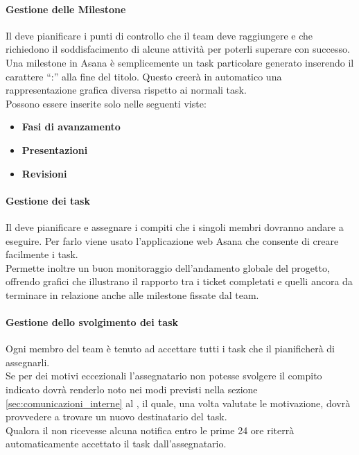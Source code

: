 			\paragraph{Gestione delle Milestone} %
			\label{par:gestione_delle_milestone}
			Il \roleProjectManager{} deve pianificare i punti di controllo che il team deve raggiungere e che richiedono il soddisfacimento di alcune attività per poterli superare con successo. \\
			Una milestone\gloss{} in Asana\gloss{} è semplicemente un task\gloss{} particolare generato inserendo il carattere ``:'' alla fine del titolo. Questo creerà in automatico una rappresentazione grafica diversa rispetto ai normali task. \\
			Possono essere inserite solo nelle seguenti viste:
				\begin{itemize}
					\item \textbf{Fasi di avanzamento}
					\item \textbf{Presentazioni}
					\item \textbf{Revisioni}
				\end{itemize}
			
			\paragraph{Gestione dei task}
			\label{sec:gestione_dei_task}
			Il \roleProjectManager{} deve pianificare e assegnare i compiti che i singoli membri dovranno andare a eseguire. Per farlo viene usato l'applicazione web Asana\gloss{} che consente di creare facilmente i task\gloss{}. \\
			Permette inoltre un buon monitoraggio dell'andamento globale del progetto, offrendo grafici che illustrano il rapporto tra i ticket\gloss{} completati e quelli ancora da terminare in relazione anche alle milestone\gloss{} fissate dal team.
			
			\paragraph{Gestione dello svolgimento dei task} %
			\label{par:gestione_dello_svolgimento_dei_task}
			Ogni membro del team è tenuto ad accettare tutti i task\gloss{} che il \roleProjectManager{} pianificherà di assegnarli. \\
			Se per dei motivi eccezionali l'assegnatario non potesse svolgere il compito indicato dovrà renderlo noto nei modi previsti nella sezione \ref{sec:comunicazioni_interne} al \roleProjectManager, il quale, una volta valutate le motivazione, dovrà provvedere a trovare un nuovo destinatario del task. \\
			Qualora il \roleProjectManager{} non ricevesse alcuna notifica entro le prime 24 ore riterrà automaticamente accettato il task\gloss{} dall'assegnatario.
			
